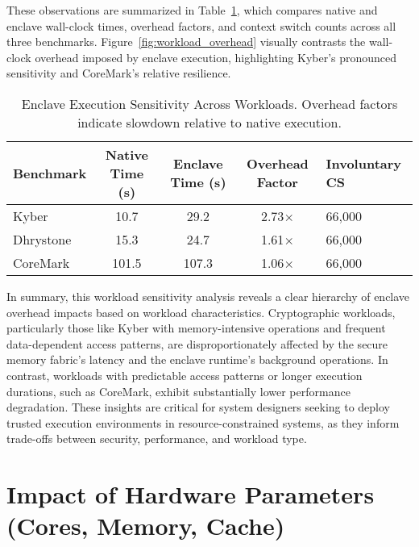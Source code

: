 These observations are summarized in Table~\ref{tab:sensitivity-overheads}, which compares native and enclave wall-clock times, overhead factors, and context switch counts across all three benchmarks. Figure~\ref{fig:workload_overhead} visually contrasts the wall-clock overhead imposed by enclave execution, highlighting Kyber’s pronounced sensitivity and CoreMark’s relative resilience.

\begin{table}[h]
\centering
\begin{tabular}{|l|c|c|c|p{3.5cm}|}
\hline
\textbf{Benchmark} & \textbf{Native Time (s)} & \textbf{Enclave Time (s)} & \textbf{Overhead Factor} & \textbf{Involuntary CS} \\
\hline
Kyber     & 10.7   & 29.2   & 2.73$\times$  & 66,000 \\
\hline
Dhrystone & 15.3   & 24.7   & 1.61$\times$  & 66,000 \\
\hline
CoreMark  & 101.5  & 107.3  & 1.06$\times$  & 66,000 \\
\hline
\end{tabular}
\caption{Enclave Execution Sensitivity Across Workloads. Overhead factors indicate slowdown relative to native execution.}
\label{tab:sensitivity-overheads}
\end{table}


In summary, this workload sensitivity analysis reveals a clear hierarchy of enclave overhead impacts based on workload characteristics. Cryptographic workloads, particularly those like Kyber with memory-intensive operations and frequent data-dependent access patterns, are disproportionately affected by the secure memory fabric’s latency and the enclave runtime’s background operations. In contrast, workloads with predictable access patterns or longer execution durations, such as CoreMark, exhibit substantially lower performance degradation. These insights are critical for system designers seeking to deploy trusted execution environments in resource-constrained systems, as they inform trade-offs between security, performance, and workload type.

\section{Impact of Hardware Parameters (Cores, Memory, Cache)}


